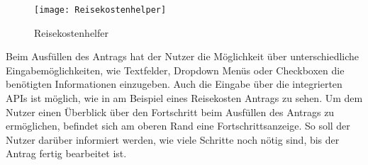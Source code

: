 \begin{figure}[h]
  \centering
    \texttt{[image: Reisekostenhelper]}
    \caption{Reisekostenhelfer}\label{Reisekostenhelfer}
\end{figure}


Beim Ausfüllen des Antrags hat der Nutzer die Möglichkeit über unterschiedliche Eingabemöglichkeiten,
wie Textfelder, Dropdown Menüs oder Checkboxen die benötigten Informationen einzugeben. Auch die Eingabe
über die integrierten \ac{API}s ist möglich, wie in  am Beispiel eines Reisekosten Antrags zu sehen.
Um dem Nutzer einen Überblick über den Fortschritt beim Ausfüllen des Antrags zu ermöglichen, befindet sich am oberen 
Rand eine Fortschrittsanzeige.
So soll der Nutzer darüber informiert werden, wie viele Schritte noch
nötig sind, bis der Antrag fertig bearbeitet ist.